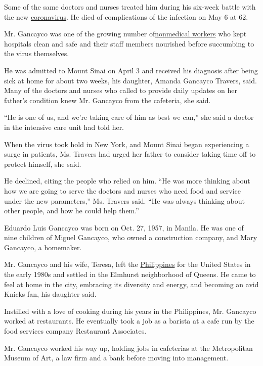 Some of the same doctors and nurses treated him during his six-week
battle with the new
\href{https://www.nytimes3xbfgragh.onion/2020/06/22/world/asia/coronavirus-philippines-priest.html}{coronavirus}.
He died of complications of the infection on May 6 at 62.

Mr. Gancayco was one of the growing number
of\href{https://www.nytimes3xbfgragh.onion/2020/05/04/nyregion/coronavirus-ny-hospital-workers.html}{nonmedical
workers} who kept hospitals clean and safe and their staff members
nourished before succumbing to the virus themselves.

He was admitted to Mount Sinai on April 3 and received his diagnosis
after being sick at home for about two weeks, his daughter, Amanda
Gancayco Travers, said. Many of the doctors and nurses who called to
provide daily updates on her father's condition knew Mr. Gancayco from
the cafeteria, she said.

``He is one of us, and we're taking care of him as best we can,'' she
said a doctor in the intensive care unit had told her.

When the virus took hold in New York, and Mount Sinai began experiencing
a surge in patients, Ms. Travers had urged her father to consider taking
time off to protect himself, she said.

He declined, citing the people who relied on him. ``He was more thinking
about how we are going to serve the doctors and nurses who need food and
service under the new parameters,'' Ms. Travers said. ``He was always
thinking about other people, and how he could help them.''

Eduardo Luis Gancayco was born on Oct. 27, 1957, in Manila. He was one
of nine children of Miguel Gancayco, who owned a construction company,
and Mary Gancayco, a homemaker.

Mr. Gancayco and his wife, Teresa, left the
\href{https://www.nytimes3xbfgragh.onion/2020/06/22/world/asia/coronavirus-philippines-priest.html}{Philippines}
for the United States in the early 1980s and settled in the Elmhurst
neighborhood of Queens. He came to feel at home in the city, embracing
its diversity and energy, and becoming an avid Knicks fan, his daughter
said.

Instilled with a love of cooking during his years in the Philippines,
Mr. Gancayco worked at restaurants. He eventually took a job as a
barista at a cafe run by the food services company Restaurant
Associates.

Mr. Gancayco worked his way up, holding jobs in cafeterias at the
Metropolitan Museum of Art, a law firm and a bank before moving into
management.

